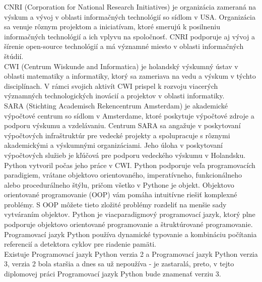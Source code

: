 \tab[5 mm] CNRI (Corporation for National Research Initiatives) je organizácia zameraná na výskum a vývoj v oblasti informačných technológií so sídlom v USA. Organizácia sa venuje rôznym projektom a iniciatívam, ktoré smerujú k posilneniu informačných technológií a ich vplyvu na spoločnosť. CNRI podporuje aj vývoj a šírenie open-source technológií a má významné miesto v oblasti informačných štúdií.\\
\tab[5 mm] CWI (Centrum Wiskunde and Informatica) je holandský výskumný ústav v oblasti matematiky a informatiky, ktorý sa zameriava na vedu a výskum v týchto disciplínach. V rámci svojich aktivít CWI prispel k rozvoju viacerých významných technologických inovácií a projektov v oblasti informatiky.\\
\tab[5 mm] SARA (Stichting Academisch Rekencentrum Amsterdam) je akademické výpočtové centrum so sídlom v Amsterdame, ktoré poskytuje výpočtové zdroje a podporu výskumu a vzdelávaniu. Centrum SARA sa angažuje v poskytovaní výpočtových infraštruktúr pre vedecké projekty a spolupracuje s rôznymi akademickými a výskumnými organizáciami.   Jeho úloha v poskytovaní výpočtových služieb je kľúčová pre podporu vedeckého výskumu v Holandsku. \\ 
Python vytvoril počas jeho práce v CWI\cite{PYthon5}. Python podporuje veľa programovacích paradigiem, vrátane objektovo orientovaného, imperatívneho, funkcionálneho alebo procedurálneho štýlu, pričom všetko v Pythone je objekt. Objektovo orientované programovanie (OOP) vám pomáha intuitívne riešiť komplexné problémy. S OOP môžete tieto zložité problémy rozdeliť na menšie sady vytváraním objektov.
Python je viacparadigmový programovací jazyk, ktorý plne podporuje objektovo orientované programovanie a štruktúrované programovanie. Programovací jazyk Python používa dynamické typovanie a kombináciu počítania referencií a detektora cyklov pre riadenie pamäti. \\
\tab[5 mm] Existuje Programovací jazyk Python verzia 2 a Programovací jazyk Python verzia 3, verzia 2 bola staršia a dnes sa už nepoužíva - je zastaralá, preto, v tejto diplomovej práci Programovací jazyk Python bude znamenať verziu 3.  
